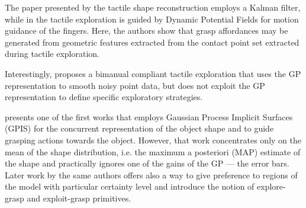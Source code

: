 The paper presented by \citet{Meier2011Probabilistic} the tactile shape reconstruction employs a Kalman filter, while in \citet{Bierbaum2008Potential} the tactile exploration is guided by Dynamic Potential Fields for motion guidance
of the fingers. Here, the authors show that grasp affordances may be generated from geometric features extracted from the contact point set extracted during tactile exploration.

Interestingly, \citet{Sommer2014Bimanual} proposes a bimanual compliant tactile exploration that uses the GP representation to smooth noisy point data, but does not exploit the GP representation to define specific exploratory strategies.

\cite{Dragiev2011Gaussian} presents one of the first works that employs Gaussian Process Implicit Surfaces (GPIS) for the concurrent representation of the object shape and to guide grasping actions towards the object. However, that work concentrates only on the mean of the shape distribution, i.e. the maximum a posteriori (MAP) estimate of the shape and practically ignores one of the gains of the GP --- the error bars.
Later work by the same authors \citep{Dragiev2013Uncertainty} offers also a way to give preference to regions of the model with particular certainty level and introduce the notion of explore-grasp and exploit-grasp primitives.

